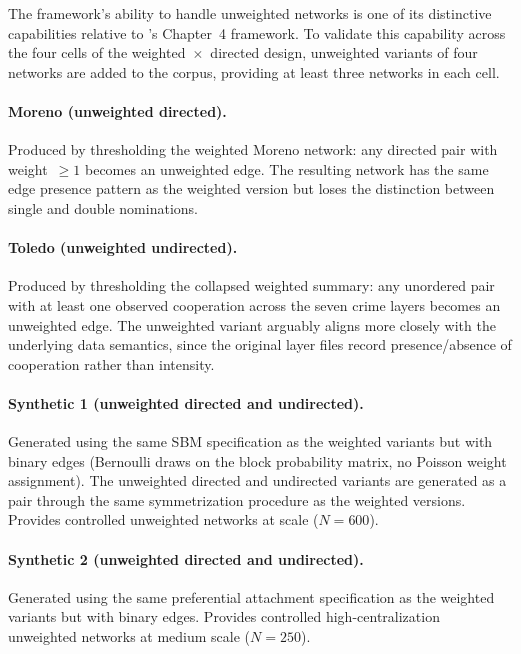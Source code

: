\documentclass[11pt]{article}
\begin{document}
The framework's ability to handle unweighted networks is one of its distinctive capabilities relative to \citet{Bellutta2026}'s Chapter~4 framework. To validate this capability across the four cells of the weighted~$\times$~directed design, unweighted variants of four networks are added to the corpus, providing at least three networks in each cell.

\paragraph{Moreno (unweighted directed).} Produced by thresholding the weighted Moreno network: any directed pair with weight~$\geq 1$ becomes an unweighted edge. The resulting network has the same edge presence pattern as the weighted version but loses the distinction between single and double nominations.

\paragraph{Toledo (unweighted undirected).} Produced by thresholding the collapsed weighted summary: any unordered pair with at least one observed cooperation across the seven crime layers becomes an unweighted edge. The unweighted variant arguably aligns more closely with the underlying data semantics, since the original layer files record presence/absence of cooperation rather than intensity.

\paragraph{Synthetic 1 (unweighted directed and undirected).} Generated using the same SBM specification as the weighted variants but with binary edges (Bernoulli draws on the block probability matrix, no Poisson weight assignment). The unweighted directed and undirected variants are generated as a pair through the same symmetrization procedure as the weighted versions. Provides controlled unweighted networks at scale ($N = 600$).

\paragraph{Synthetic 2 (unweighted directed and undirected).} Generated using the same preferential attachment specification as the weighted variants but with binary edges. Provides controlled high-centralization unweighted networks at medium scale ($N = 250$).
\end{document}
